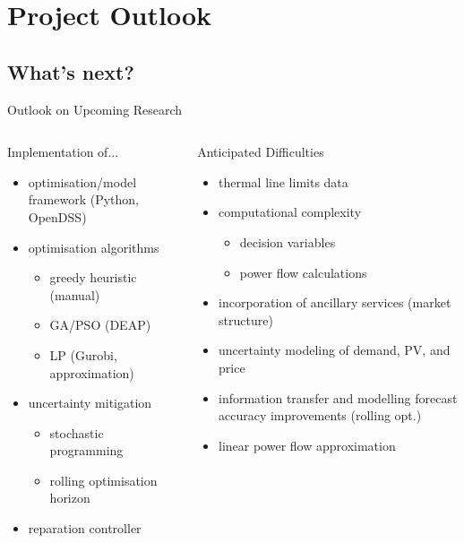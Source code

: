 \documentclass[handout]{beamer}
\begin{document}
\section{Project Outlook}

\subsection*{What's next?}

\begin{frame}{Outlook on Upcoming Research}
	\begin{columns}[T]
		\begin{column}{6cm}
			\textcolor{UOEpink}{Implementation of...}
			\begin{itemize}
				\item optimisation/model framework \textcolor{UOEblue2}{(Python, OpenDSS)}
				\item optimisation algorithms
				\begin{itemize}
					\item greedy heuristic \textcolor{UOEblue2}{(manual)}
					\item GA/PSO \textcolor{UOEblue2}{(DEAP)}
					\item LP \textcolor{UOEblue2}{(Gurobi, approximation)}
				\end{itemize}
				\item uncertainty mitigation
				\begin{itemize}
					\item stochastic programming
					\item rolling optimisation horizon
				\end{itemize}
				\item reparation controller
			\end{itemize}
		\end{column}
	\pause
		\begin{column}{5.5cm}
			\textcolor{UOEgreen}{Anticipated Difficulties}
			\begin{itemize}
				\item thermal line limits data
				\item computational complexity
				\begin{itemize}
					\item decision variables
					\item power flow calculations
				\end{itemize}
				\item incorporation of ancillary services \textcolor{UOEblue2}{(market structure)}
				\item uncertainty modeling of demand, PV, and price
				\item information transfer and modelling forecast accuracy improvements \textcolor{UOEblue2}{(rolling opt.)}
				\item linear power flow approximation
			\end{itemize}
		\end{column}	
	\end{columns}
\end{frame}
\end{document}
